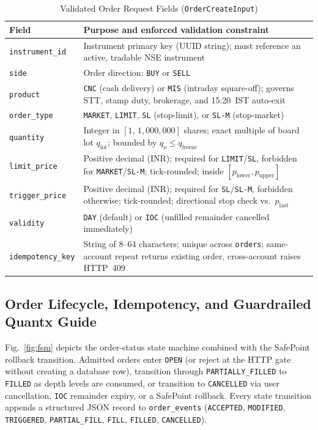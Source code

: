 \documentclass[12pt]{article}
\begin{document}
\begin{table}[!htbp]\begin{singlespace}
\caption{Validated Order Request Fields (\texttt{OrderCreateInput})}
\label{tab:fields}
\centering
\small
\renewcommand{\arraystretch}{1.12}
\begin{tabularx}{\textwidth}{@{}>{\raggedright\arraybackslash}p{1.35in}X@{}}
\toprule
Field & Purpose and enforced validation constraint \\
\midrule
\texttt{instrument\_id} & Instrument primary key (UUID string); must reference an active, tradable NSE instrument \\
\texttt{side} & Order direction: \texttt{BUY} or \texttt{SELL} \\
\texttt{product} & \texttt{CNC} (cash delivery) or \texttt{MIS} (intraday square-off); governs STT, stamp duty, brokerage, and 15:20~IST auto-exit \\
\texttt{order\_type} & \texttt{MARKET}, \texttt{LIMIT}, \texttt{SL} (stop-limit), or \texttt{SL-M} (stop-market) \\
\texttt{quantity} & Integer in $[1,\,1{,}000{,}000]$ shares; exact multiple of board lot $q_{\mathrm{lot}}$; bounded by $q_o \le q_{\mathrm{freeze}}$ \\
\texttt{limit\_price} & Positive decimal (INR); required for \texttt{LIMIT}/\texttt{SL}, forbidden for \texttt{MARKET}/\texttt{SL-M}; tick-rounded; inside $[p_{\mathrm{lower}}, p_{\mathrm{upper}}]$ \\
\texttt{trigger\_price} & Positive decimal (INR); required for \texttt{SL}/\texttt{SL-M}, forbidden otherwise; tick-rounded; directional stop check vs.\ $p_{\mathrm{last}}$ \\
\texttt{validity} & \texttt{DAY} (default) or \texttt{IOC} (unfilled remainder cancelled immediately) \\
\texttt{idempotency\_key} & String of 8--64 characters; unique across \texttt{orders}; same-account repeat returns existing order, cross-account raises HTTP~409 \\
\bottomrule
\end{tabularx}
\end{singlespace}\end{table}

\subsection{Order Lifecycle, Idempotency, and Guardrailed Quantx Guide}
Fig.~\ref{fig:fsm} depicts the order-status state machine combined with the SafePoint rollback transition. Admitted orders enter \texttt{OPEN} (or reject at the HTTP gate without creating a database row), transition through \texttt{PARTIALLY\_FILLED} to \texttt{FILLED} as depth levels are consumed, or transition to \texttt{CANCELLED} via user cancellation, \texttt{IOC} remainder expiry, or a SafePoint rollback. Every state transition appends a structured JSON record to \texttt{order\_events} (\texttt{ACCEPTED}, \texttt{MODIFIED}, \texttt{TRIGGERED}, \texttt{PARTIAL\_FILL}, \texttt{FILL}, \texttt{FILLED}, \texttt{CANCELLED}).
\end{document}
